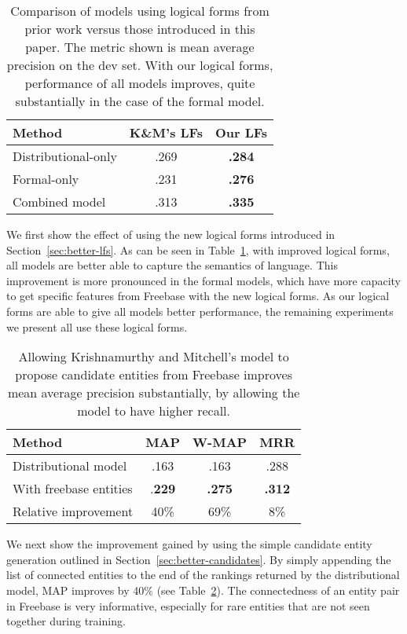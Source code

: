 \documentclass[11pt]{article}
\newcommand{\secref}[1]{Section~\ref{sec:#1}}
\newcommand{\tabref}[1]{Table~\ref{tab:#1}}
\begin{document}
\begin{table}
  \centering
  {\small
    \begin{tabular}{lcc}
      \toprule
      Method & K\&M's LFs & Our LFs \\
      \midrule
      Distributional-only & .269 & \textbf{.284} \\
      \midrule
      Formal-only & .231 & \textbf{.276} \\
      \midrule
      Combined model & .313 & \textbf{.335} \\
      \bottomrule
    \end{tabular}
  }
  \caption{Comparison of models using logical forms from prior work
  versus those introduced in this paper.  The metric shown is mean
  average precision on the dev set.  With our logical forms,
  performance of all models improves, quite substantially in the case
  of the formal model.}
  \label{tab:better-lfs}
\end{table}

We first show the effect of using the new logical forms introduced in
\secref{better-lfs}.  As can be seen in \tabref{better-lfs}, with
improved logical forms, all models are better able to capture the
semantics of language.  This improvement is more pronounced in the
formal models, which have more capacity to get specific features from
Freebase with the new logical forms.  As our logical forms are able to
give all models better performance, the remaining experiments we
present all use these logical forms.

\begin{table}
  \centering
  {\small
    \begin{tabular}{lccc}
      \toprule
      Method & MAP & W-MAP & MRR \\
      \midrule
      Distributional model & .163 & .163 & .288 \\
      \midrule
      With freebase entities & .\textbf{229} & \textbf{.275} & \textbf{.312} \\
      \bottomrule
      Relative improvement & 40\% & 69\% & 8\% \\
      \bottomrule
    \end{tabular}
  }
  \caption{Allowing Krishnamurthy and Mitchell's model to propose
  candidate entities from Freebase improves mean average precision
  substantially, by allowing the model to have higher recall.}
  \label{tab:better-candidates}
\end{table}

We next show the improvement gained by using the simple candidate
entity generation outlined in \secref{better-candidates}.  By simply
appending the list of connected entities to the end of the rankings
returned by the distributional model, MAP improves by 40\% (see
\tabref{better-candidates}).  The connectedness of an entity pair in
Freebase is very informative, especially for rare entities that are
not seen together during training.
\end{document}
